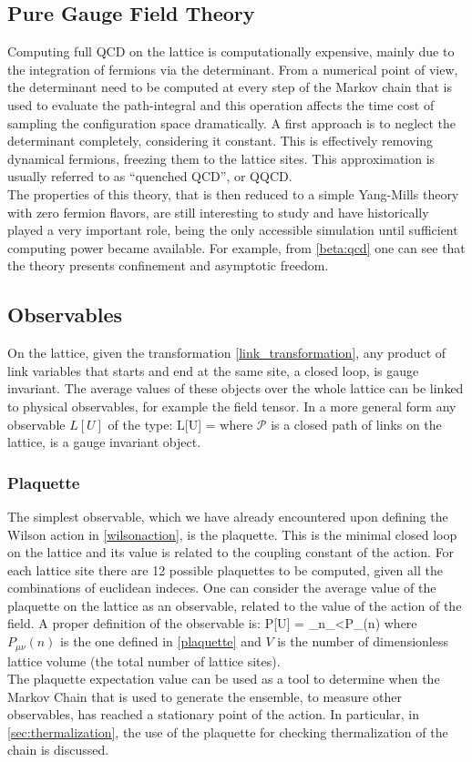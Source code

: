 \subsection{Pure Gauge Field Theory}
Computing full QCD on the lattice is computationally expensive, mainly due to the integration of fermions via the determinant. From a numerical point of view, the determinant need to be computed at every step of the Markov chain that is used to evaluate the path-integral and this operation affects the time cost of sampling the configuration space dramatically. A first approach is to neglect the determinant completely, considering it constant. This is effectively removing dynamical fermions, freezing them to the lattice sites. This approximation is usually referred to as ``quenched QCD'', or QQCD. \\
The properties of this theory, that is then reduced to a simple Yang-Mills theory with zero fermion flavors, are still interesting to study and have historically played a very important role, being the only accessible simulation until sufficient computing power became available. For example, from \cref{beta:qcd} one can see that the theory presents confinement and asymptotic freedom. 

\subsection{Observables}
On the lattice, given the transformation \ref{link_transformation}, any product of link variables that starts and end at the same site, a closed loop, is gauge invariant. The average values of these objects over the whole lattice can be linked to physical observables, for example the field tensor. In a more general form any observable $L[U]$ of the type:
\beq
    L[U] = \Tr {}
\eeq
where $\mathcal{P}$ is a closed path of links on the lattice, is a gauge invariant object.

\subsubsection{Plaquette}
The simplest observable, which we have already encountered upon defining the Wilson action in \ref{wilsonaction}, is the plaquette. This is the minimal closed loop on the lattice and its value is related to the coupling constant of the action. For each lattice site there are 12 possible plaquettes to be computed, given all the combinations of euclidean indeces. One can consider the average value of the plaquette on the lattice as an observable, related to the value of the action of the field. A proper definition of the observable is:
\beq
    P[U] = \sum_{n\in\Lambda}\sum_{\mu<\nu}P_{\mu\nu}(n)
\eeq
where $P_{\mu\nu}(n)$ is the one defined in \cref{plaquette} and $V$ is the number of dimensionless lattice volume (the total number of lattice sites). \\
The plaquette expectation value can be used as a tool to determine when the Markov Chain that is used to generate the ensemble, to measure  other observables, has reached a stationary point of the action. In particular, in \cref{sec:thermalization}, the use of the plaquette for checking thermalization of the chain is discussed.

